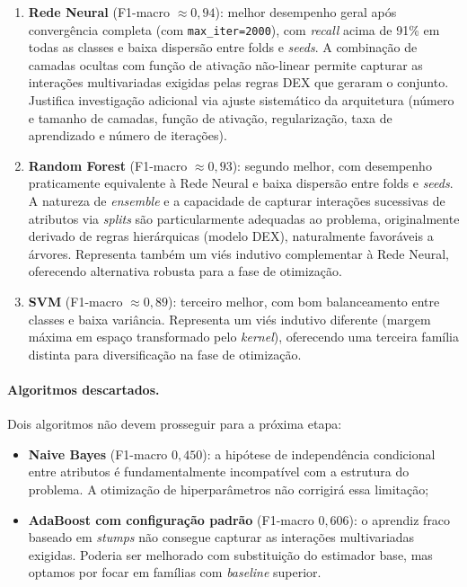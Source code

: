 \documentclass[11pt,a4paper]{article}
\newcommand{\code}[1]{\texttt{\small #1}}
\begin{document}
\begin{enumerate}
\item \textbf{Rede Neural} (F1-macro $\approx 0{,}94$): melhor desempenho geral após convergência completa (com \code{max\_iter=2000}), com \textit{recall} acima de 91\% em todas as classes e baixa dispersão entre folds e \textit{seeds}. A combinação de camadas ocultas com função de ativação não-linear permite capturar as interações multivariadas exigidas pelas regras DEX que geraram o conjunto. Justifica investigação adicional via ajuste sistemático da arquitetura (número e tamanho de camadas, função de ativação, regularização, taxa de aprendizado e número de iterações).
\item \textbf{Random Forest} (F1-macro $\approx 0{,}93$): segundo melhor, com desempenho praticamente equivalente à Rede Neural e baixa dispersão entre folds e \textit{seeds}. A natureza de \textit{ensemble} e a capacidade de capturar interações sucessivas de atributos via \textit{splits} são particularmente adequadas ao problema, originalmente derivado de regras hierárquicas (modelo DEX), naturalmente favoráveis a árvores. Representa também um viés indutivo complementar à Rede Neural, oferecendo alternativa robusta para a fase de otimização.
\item \textbf{SVM} (F1-macro $\approx 0{,}89$): terceiro melhor, com bom balanceamento entre classes e baixa variância. Representa um viés indutivo diferente (margem máxima em espaço transformado pelo \textit{kernel}), oferecendo uma terceira família distinta para diversificação na fase de otimização.
\end{enumerate}

\paragraph{Algoritmos descartados.} Dois algoritmos não devem prosseguir para a próxima etapa:

\begin{itemize}
\item \textbf{Naive Bayes} (F1-macro $0{,}450$): a hipótese de independência condicional entre atributos é fundamentalmente incompatível com a estrutura do problema. A otimização de hiperparâmetros não corrigirá essa limitação;
\item \textbf{AdaBoost com configuração padrão} (F1-macro $0{,}606$): o aprendiz fraco baseado em \textit{stumps} não consegue capturar as interações multivariadas exigidas. Poderia ser melhorado com substituição do estimador base, mas optamos por focar em famílias com \textit{baseline} superior.
\end{itemize}
\end{document}
